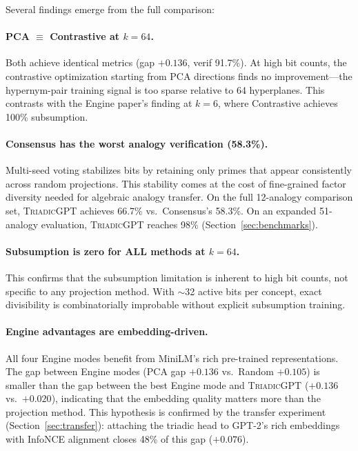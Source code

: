 \documentclass[11pt,a4paper]{article}
\newcommand{\microgpt}{\textsc{TriadicGPT}}
\begin{document}
Several findings emerge from the full comparison:

\paragraph{PCA $\equiv$ Contrastive at $k=64$.} Both achieve identical metrics (gap $+0.136$, verif 91.7\%). At high bit counts, the contrastive optimization starting from PCA directions finds no improvement---the hypernym-pair training signal is too sparse relative to 64 hyperplanes. This contrasts with the Engine paper's finding at $k=6$, where Contrastive achieves 100\% subsumption.

\paragraph{Consensus has the worst analogy verification (58.3\%).} Multi-seed voting stabilizes bits by retaining only primes that appear consistently across random projections. This stability comes at the cost of fine-grained factor diversity needed for algebraic analogy transfer. On the full 12-analogy comparison set, \microgpt{} achieves 66.7\% vs.\ Consensus's 58.3\%. On an expanded 51-analogy evaluation, \microgpt{} reaches 98\% (Section~\ref{sec:benchmarks}).

\paragraph{Subsumption is zero for ALL methods at $k=64$.} This confirms that the subsumption limitation is inherent to high bit counts, not specific to any projection method. With $\sim$32 active bits per concept, exact divisibility is combinatorially improbable without explicit subsumption training.

\paragraph{Engine advantages are embedding-driven.} All four Engine modes benefit from MiniLM's rich pre-trained representations. The gap between Engine modes (PCA gap $+0.136$ vs.\ Random $+0.105$) is smaller than the gap between the best Engine mode and \microgpt{} ($+0.136$ vs.\ $+0.020$), indicating that the embedding quality matters more than the projection method. This hypothesis is confirmed by the transfer experiment (Section~\ref{sec:transfer}): attaching the triadic head to GPT-2's rich embeddings with InfoNCE alignment closes 48\% of this gap ($+0.076$).
\end{document}
